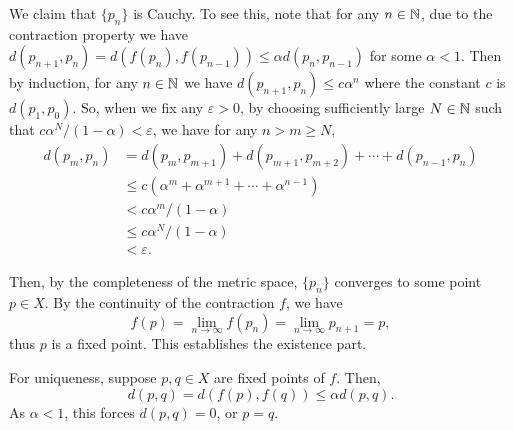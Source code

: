 \begin{enumerate}
\begin{pf}
We claim that \(\{p_n\}\) is Cauchy. To see this, note that for any \(n\in\mathbb{N}\),
due to the contraction property we have
\(d(p_{n+1},p_n)=d(f(p_{n}),f(p_{n-1}))\le \alpha d(p_{n},p_{n-1})\) for some
\(\alpha<1\). Then by induction, for any \(n\in\mathbb{N}\) we have \(d(p_{n+1},p_n)\le
c\alpha^n\) where the constant \(c\) is \(d(p_1,p_0)\). So, when we fix any
\(\varepsilon>0\), by choosing sufficiently large \(N\in\mathbb{N}\) such that
\(c\alpha^N/(1-\alpha)<\varepsilon\), we have for any \(n>m\ge N\),
\begin{align*}
d(p_m,p_n)&=d(p_m,p_{m+1})+d(p_{m+1},p_{m+2})+\dotsb+d(p_{n-1},p_n) \\
&\le c(\alpha^m+\alpha^{m+1}+\dotsb+\alpha^{n-1}) \\
&<c\alpha^m/(1-\alpha) \\
&\le c\alpha^{N}/(1-\alpha) \\
&<\varepsilon.
\end{align*}

Then, by the completeness of the metric space, \(\{p_n\}\) converges to some
point \(p\in X\). By the continuity of the contraction \(f\), we have
\[
f(p)=\lim_{n\to \infty}f(p_n)=\lim_{n\to \infty}p_{n+1}=p,
\]
thus \(p\) is a fixed point. This establishes the existence part.

For uniqueness, suppose \(p,q\in X\) are fixed points of \(f\). Then,
\[
d(p,q)=d(f(p),f(q))\le \alpha d(p,q).
\]
As \(\alpha<1\), this forces \(d(p,q)=0\), or \(p=q\).
\end{pf}
\end{enumerate}
